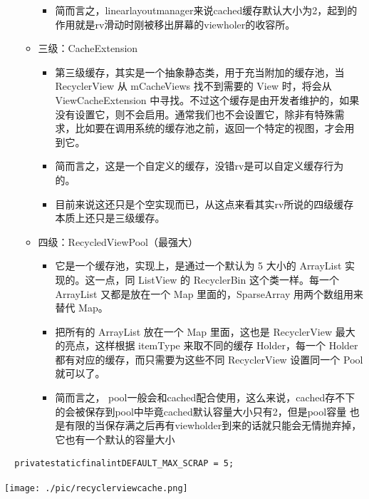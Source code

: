 \documentclass[9pt, b5paper]{article}
\begin{document}
\begin{itemize}
\begin{itemize}
\begin{itemize}
\item 简而言之，linearlayoutmanager来说cached缓存默认大小为2，起到的作用就是rv滑动时刚被移出屏幕的viewholer的收容所。
\end{itemize}
\item 三级：CacheExtension
\begin{itemize}
\item 第三级缓存，其实是一个抽象静态类，用于充当附加的缓存池，当 RecyclerView 从 mCacheViews 找不到需要的 View 时，将会从 ViewCacheExtension 中寻找。不过这个缓存是由开发者维护的，如果没有设置它，则不会启用。通常我们也不会设置它，除非有特殊需求，比如要在调用系统的缓存池之前，返回一个特定的视图，才会用到它。
\item 简而言之，这是一个自定义的缓存，没错rv是可以自定义缓存行为的。
\item 目前来说这还只是个空实现而已，从这点来看其实rv所说的四级缓存本质上还只是三级缓存。
\end{itemize}
\item 四级：RecycledViewPool（最强大）
\begin{itemize}
\item 它是一个缓存池，实现上，是通过一个默认为 5 大小的 ArrayList 实现的。这一点，同 ListView 的 RecyclerBin 这个类一样。每一个 ArrayList 又都是放在一个 Map 里面的，SparseArray 用两个数组用来替代 Map。
\item 把所有的 ArrayList 放在一个 Map 里面，这也是 RecyclerView 最大的亮点，这样根据 itemType 来取不同的缓存 Holder，每一个 Holder 都有对应的缓存，而只需要为这些不同 RecyclerView 设置同一个 Pool 就可以了。
\item 简而言之， pool一般会和cached配合使用，这么来说，cached存不下的会被保存到pool中毕竟cached默认容量大小只有2，但是pool容量 也是有限的当保存满之后再有viewholder到来的话就只能会无情抛弃掉，它也有一个默认的容量大小
\end{itemize}
\end{itemize}
\end{itemize}
\begin{verbatim}
  privatestaticfinalintDEFAULT_MAX_SCRAP = 5;
\end{verbatim}

\texttt{[image: ./pic/recyclerviewcache.png]}
\end{document}
